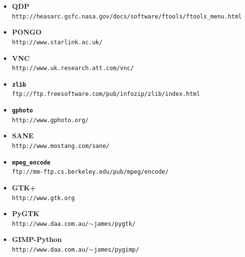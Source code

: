 \documentclass[twoside,11pt]{article}
\newcommand{\htmladdnormallink}[2]{#1}
\begin{document}
\begin{itemize}
\item {\bf\label{sc15_available_qdp}QDP}\\
\htmladdnormallink{{\tt http://heasarc.gsfc.nasa.gov/docs/software/ftools/ftools\_menu.html}}{http://heasarc.gsfc.nasa.gov/docs/software/ftools/ftools\_menu.html}

\item {\bf\label{sc15_available_pongo}PONGO}\\
\htmladdnormallink{{\tt http://www.starlink.ac.uk/}}{http://www.starlink.ac.uk/}

\item {\bf\label{sc15_available_vnc}VNC}\\
\htmladdnormallink{{\tt http://www.uk.research.att.com/vnc/}}{http://www.uk.research.att.com/vnc/}

\item {\bf\label{sc15_available_zlib}{\tt zlib}}\\
\htmladdnormallink{{\tt ftp://ftp.freesoftware.com/pub/infozip/zlib/index.html}}{ftp://ftp.freesoftware.com/pub/infozip/zlib/index.html}

\item {\bf\label{sc15_available_gphoto}{\tt gphoto}}\\
\htmladdnormallink{{\tt http://www.gphoto.org/}}{http://www.gphoto.org/}

\item {\bf\label{sc15_available_sane}SANE}\\
\htmladdnormallink{{\tt http://www.mostang.com/sane/}}{http://www.mostang.com/sane/}

\item {\bf\label{sc15_available_mpegencode}{\tt mpeg\_encode}}\\
\htmladdnormallink{{\tt ftp://mm-ftp.cs.berkeley.edu/pub/mpeg/encode/}}{ftp://mm-ftp.cs.berkeley.edu/pub/mpeg/encode/}

\item {\bf\label{sc15_available_gtk+}GTK+}\\
\htmladdnormallink{{\tt http://www.gtk.org}}{http://www.gtk.org}

\item {\bf\label{sc15_available_pygtk}PyGTK}\\
\htmladdnormallink{{\tt http://www.daa.com.au/$\sim$james/pygtk/}}{http://www.daa.com.au/~james/pygtk/}

\item {\bf\label{sc15_available_gimppython}GIMP-Python}\\
\htmladdnormallink{{\tt http://www.daa.com.au/$\sim$james/pygimp/}}{http://www.daa.com.au/~james/pygimp/}


\end{itemize}
\end{document}
